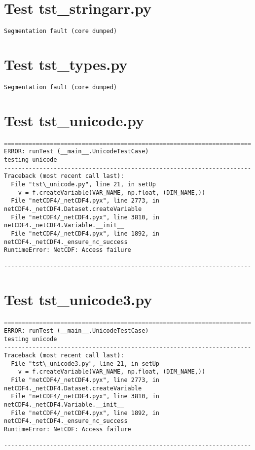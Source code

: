 \begin{verbatim}

\end{verbatim}

\section{Test tst\_stringarr.py}

\begin{verbatim}
Segmentation fault (core dumped)
\end{verbatim}

\section{Test tst\_types.py}

\begin{verbatim}
Segmentation fault (core dumped)
\end{verbatim}

\section{Test tst\_unicode.py}

\begin{verbatim}
======================================================================
ERROR: runTest (__main__.UnicodeTestCase)
testing unicode
----------------------------------------------------------------------
Traceback (most recent call last):
  File "tst\_unicode.py", line 21, in setUp
    v = f.createVariable(VAR_NAME, np.float, (DIM_NAME,))
  File "netCDF4/_netCDF4.pyx", line 2773, in netCDF4._netCDF4.Dataset.createVariable
  File "netCDF4/_netCDF4.pyx", line 3810, in netCDF4._netCDF4.Variable.__init__
  File "netCDF4/_netCDF4.pyx", line 1892, in netCDF4._netCDF4._ensure_nc_success
RuntimeError: NetCDF: Access failure

----------------------------------------------------------------------
\end{verbatim}

\section{Test tst\_unicode3.py}

\begin{verbatim}
======================================================================
ERROR: runTest (__main__.UnicodeTestCase)
testing unicode
----------------------------------------------------------------------
Traceback (most recent call last):
  File "tst\_unicode3.py", line 21, in setUp
    v = f.createVariable(VAR_NAME, np.float, (DIM_NAME,))
  File "netCDF4/_netCDF4.pyx", line 2773, in netCDF4._netCDF4.Dataset.createVariable
  File "netCDF4/_netCDF4.pyx", line 3810, in netCDF4._netCDF4.Variable.__init__
  File "netCDF4/_netCDF4.pyx", line 1892, in netCDF4._netCDF4._ensure_nc_success
RuntimeError: NetCDF: Access failure

----------------------------------------------------------------------
\end{verbatim}


